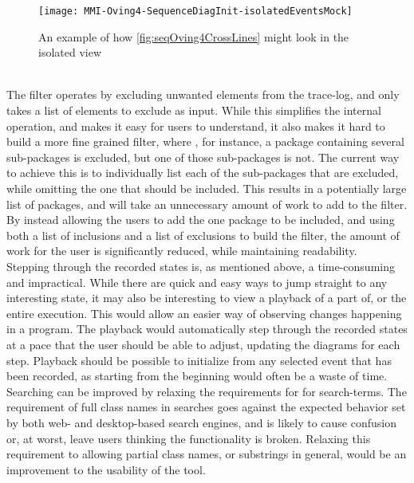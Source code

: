 \begin{figure}[H]
	\centering
	\texttt{[image: MMI-Oving4-SequenceDiagInit-isolatedEventsMock]}
	\caption{An example of how \autoref{fig:seqOving4CrossLines} might look in the isolated view}
	\label{fig:seqOving4IsolatedMock}
\end{figure}
~\\

The filter operates by excluding unwanted elements from the trace-log, and only takes a list of elements to exclude as input.
While this simplifies the internal operation, and makes it easy for users to understand, it also makes it hard to build a more fine grained filter, where , for instance, a package containing several sub-packages is excluded, but one of those sub-packages is not.
The current way to achieve this is to individually list each of the sub-packages that are excluded, while omitting the one that should be included.
This results in a potentially large list of packages, and will take an unnecessary amount of work to add to the filter.
By instead allowing the users to add the one package to be included, and using both a list of inclusions and a list of exclusions to build the filter, the amount of work for the user is significantly reduced, while maintaining readability.
~\\%

Stepping through the recorded states is, as mentioned above, a time-consuming and impractical.
While there are quick and easy ways to jump straight to any interesting state, it may also be interesting to view a playback of a part of, or the entire execution.
This would allow an easier way of observing changes happening in a program.
The playback would automatically step through the recorded states at a pace that the user should be able to adjust, updating the diagrams for each step.
Playback should be possible to initialize from any selected event that has been recorded, as starting from the beginning would often be a waste of time.
~\\

Searching can be improved by relaxing the requirements for for search-terms.
The requirement of full class names in searches goes against the expected behavior set by both web- and desktop-based search engines, and is likely to cause confusion or, at worst, leave users thinking the functionality is broken.
Relaxing this requirement to allowing partial class names, or substrings in general, would be an improvement to the usability of the tool.
~\\